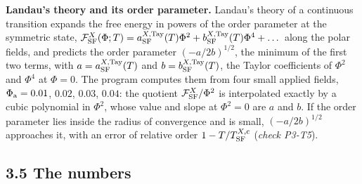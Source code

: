 \documentclass[
  10pt,
]{article}
\begin{document}
\textbf{Landau's theory and its order parameter.} Landau's theory of a
continuous transition expands the free energy in powers of the order
parameter at the symmetric state,
\(\mathcal F^X_{\rm SF}(\Phi;T)=a^{X,{\rm Tay}}_{\rm SF}(T)\Phi^2+b^{X,{\rm Tay}}_{\rm SF}(T)\Phi^4+\dots\)
along the polar fields, and predicts the order parameter
\((-a/2b)^{1/2}\), the minimum of the first two terms, with
\(a=a^{X,{\rm Tay}}_{\rm SF}(T)\) and \(b=b^{X,{\rm Tay}}_{\rm SF}(T)\),
the Taylor coefficients of \(\Phi^2\) and \(\Phi^4\) at \(\Phi=0\). The
program computes them from four small applied fields,
\(\Phi_{\rm a}=0.01\), \(0.02\), \(0.03\), \(0.04\): the quotient
\(\mathcal F^X_{\rm SF}/\Phi^2\) is interpolated exactly by a cubic
polynomial in \(\Phi^2\), whose value and slope at \(\Phi^2=0\) are
\(a\) and \(b\). If the order parameter lies inside the radius of
convergence and is small, \((-a/2b)^{1/2}\) approaches it, with an error
of relative order \(1-T/T^{X,{\rm c}}_{\rm SF}\) (\emph{check P3-T5}).

\hypertarget{the-numbers-1}{%
\subsection{3.5 The numbers}\label{the-numbers-1}}
\end{document}
